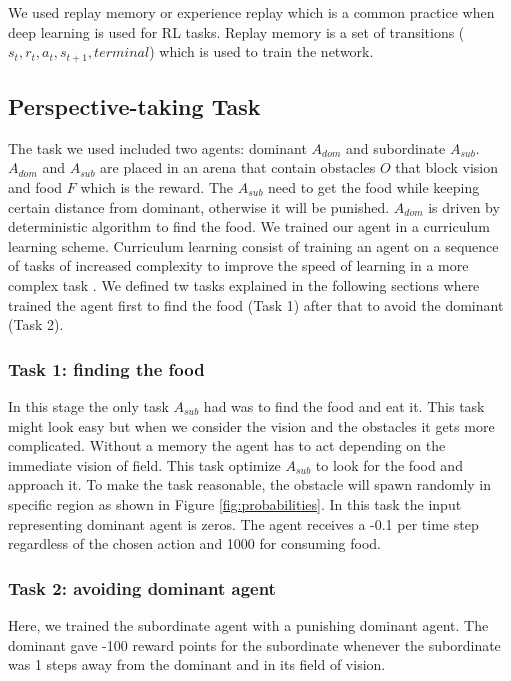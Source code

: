 \documentclass{article}
\begin{document}
\par We used replay memory or experience replay which is a common practice when deep learning is used for RL tasks\cite{DBLP:journals/corr/WangFL15,mnih2015human,mnih2013playing}. Replay memory is a set of transitions (\(s_t,r_t,a_t,s_{t+1},terminal\)) which is used to train the network.

\subsection{Perspective-taking Task}
The task we used included two agents: dominant $A_{dom}$ and subordinate $A_{sub}$. $A_{dom}$ and $A_{sub}$ are placed in an arena that contain obstacles $O$ that block vision and food $F$ which is the reward. The $A_{sub}$  need to get the food while keeping certain distance from dominant, otherwise it will be punished. $A_{dom}$ is driven by deterministic algorithm to find the food. 
We trained our agent in a curriculum learning scheme.
Curriculum learning consist of training an agent on a sequence of tasks of increased complexity to improve the speed of learning in a more complex task \cite{narvekar2016curriculum}. We defined tw tasks explained in the following sections where trained the agent first to find the food (Task 1) after that to avoid the dominant (Task 2).
\subsubsection{Task 1: finding the food} \label{task1}
In this stage the only task \(A_{sub}\) had was to find the food and eat it. This task might look easy but when we consider the vision and the obstacles it gets more complicated. Without a memory the agent has to act depending on the immediate vision of field. This task optimize \(A_{sub}\) to look for the food and approach it. To make the task reasonable, the obstacle will spawn randomly in specific region as shown in Figure \ref{fig:probabilities}. In this task the input representing dominant agent is zeros. The agent receives a -0.1 per time step regardless of the chosen action and 1000 for consuming food.
\subsubsection{Task 2: avoiding dominant agent}\label{task2}
Here, we trained the subordinate agent with a punishing dominant agent. The dominant gave -100 reward points for the subordinate whenever the subordinate was 1 steps away from the dominant and in its field of vision. 
 
\end{document}
